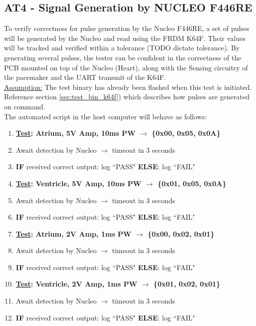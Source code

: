 \documentclass[]{article}
\begin{document}
\subsection{AT4 - Signal Generation by NUCLEO F446RE}

To verify correctness for pulse generation by the Nucleo F446RE, a set of pulses will be generated by the Nucleo and read using the FRDM K64F. Their values will be tracked and verified within a tolerance (TODO dictate tolerance). By generating several pulses, the tester can be confident in the correctness of the PCB mounted on top of the Nucleo (Heart), along with the Sensing circuitry of the pacemaker and the UART transmit of the K64F.\\

\underline{Assumption:} The test binary has already been flashed when this test is initiated.\\

Reference section \ref{sec:test_bin_k64f}) which describes how pulses are generated on command.\\

The automated script in the host computer will behave as follows:
\begin{enumerate}
	\item \textbf{\underline{Test}: Atrium, 5V Amp, 10ms PW $\rightarrow$ \{0x00, 0x05, 0x0A\}}
	\item Await detection by Nucleo $\rightarrow$ timeout in 3 seconds
	\item \textbf{IF} received correct output: log ``PASS" \textbf{ELSE}: log ``FAIL"
	
	\item \textbf{\underline{Test}: Ventricle, 5V Amp, 10ms PW $\rightarrow$ \{0x01, 0x05, 0x0A\}}
	\item Await detection by Nucleo $\rightarrow$ timeout in 3 seconds
	\item \textbf{IF} received correct output: log ``PASS" \textbf{ELSE}: log ``FAIL"
	
	\item \textbf{\underline{Test}: Atrium, 2V Amp, 1ms PW $\rightarrow$ \{0x00, 0x02, 0x01\}}
	\item Await detection by Nucleo $\rightarrow$ timeout in 3 seconds
	\item \textbf{IF} received correct output: log ``PASS" \textbf{ELSE}: log ``FAIL"
	
	\item \textbf{\underline{Test}: Ventricle, 2V Amp, 1ms PW $\rightarrow$ \{0x01, 0x02, 0x01\}}
	\item Await detection by Nucleo $\rightarrow$ timeout in 3 seconds
	\item \textbf{IF} received correct output: log ``PASS" \textbf{ELSE}: log ``FAIL"
\end{enumerate}
\end{document}
